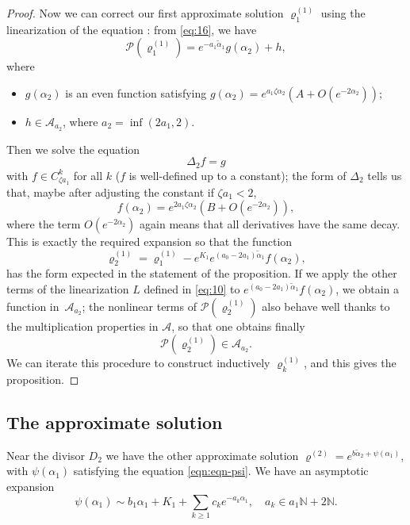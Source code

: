 \documentclass[JEP,XML,SOM,Unicode, NoEqCountersInSection, NoFloatCountersInSection]{cedram}
\theoremstyle{plain}
\theoremstyle{definition}
\newcommand{\cA}{\mathcal{A}}
\newcommand{\ta}{\tilde \alpha}
\newcommand{\opP}{\mathcal{P}}
\newcommand{\rhodeux}{\varrho^{(2)}}
\newcommand{\rhoun}{\varrho^{(1)}}
\begin{document}
\begin{proof}
Now we can correct our first approximate solution $\rhoun_1$ using the linearization of the equation : from \eqref{eq:16}, we have
\[ \opP(\rhoun_1) = e^{-a_1\ta_1} g(\alpha_2) + h, \]
where
\begin{itemize}
\item $g(\alpha_2)$ is an even function satisfying $g(\alpha_2)=e^{a_1 \zeta \alpha_2} (A+O(e^{-2\alpha_2}))$;
\item $h\in \cA_{a_2}$, where $a_2=\inf(2a_1,2)$.
\end{itemize}
Then we solve the equation
\begin{equation}
\Delta_2f=g\label{eq:32}
\end{equation}
with $f\in C^k_{\zeta a_1}$ for all $k$ ($f$ is well-defined up to a constant); the form of $\Delta_2$ tells us that, maybe after adjusting the constant if $\zeta a_1<2$,
\begin{equation}
f(\alpha_2) = e^{2a_1 \zeta \alpha_2} (B+O(e^{-2\alpha_2})),\label{eq:33}
\end{equation}
where the term $O(e^{-2\alpha_2})$ again means that all derivatives have the same decay. This is exactly the required expansion so that the function
\begin{equation}
\rhoun_2 = \rhoun_1 - e^{K_1} e^{(a_0-2a_1)\ta_1} f(\alpha_2),
\end{equation}
has the form expected in the statement of the proposition. If we apply the other terms of the linearization $L$ defined in \eqref{eq:10} to $e^{(a_0-2a_1)\ta_1} f(\alpha_2)$, we obtain a function in~$\cA_{a_2}$; the nonlinear terms of $\opP(\rhoun_2)$ also behave well thanks to the multiplication properties in $\cA$, so that one obtains finally
\[ \opP(\rhoun_2) \in \cA_{a_2}. \]
We can iterate this procedure to construct inductively $\rhoun_k$, and this gives the proposition.
\end{proof}

\subsection{The approximate solution}
\label{sec:approximate-solution}

Near the divisor $D_2$ we have the other approximate solution $\rhodeux=e^{b\ta_2+\psi(\alpha_1)}$,
with $\psi(\alpha_1)$ satisfying the equation \eqref{eqn:eqn-psi}. We have an asymptotic expansion
\begin{equation}
\psi(\alpha_1) \sim b_1\alpha_1 + K_1 + \sum_{k\ge1} c_k e^{-a_k\alpha_1}, \quad a_k\in a_1\mathbb{N}+2\mathbb{N}.\label{eq:18}
\end{equation}
\end{document}

